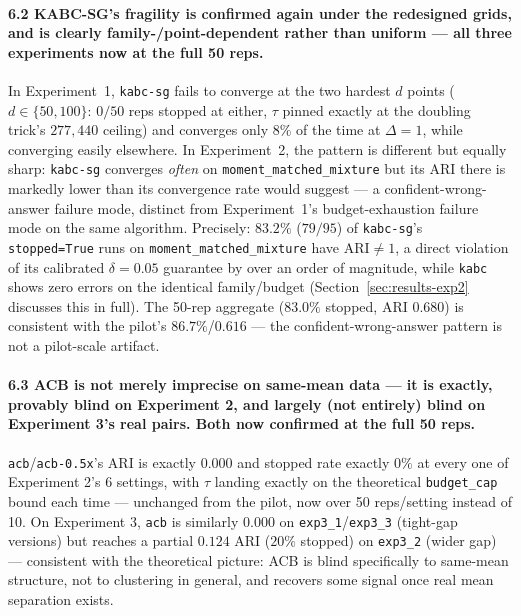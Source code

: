 \documentclass[11pt]{article}
\begin{document}
\paragraph{6.2 KABC-SG's fragility is confirmed again under the redesigned
grids, and is clearly family-/point-dependent rather than uniform --- all
three experiments now at the full 50 reps.} In Experiment~1, \texttt{kabc-sg}
fails to converge at the two hardest $d$ points ($d\in\{50,100\}$: $0/50$
reps stopped at either, $\tau$ pinned exactly at the doubling trick's
$277{,}440$ ceiling) and converges only $8\%$ of the time at $\Delta=1$,
while converging easily elsewhere. In Experiment~2, the pattern is
different but equally sharp: \texttt{kabc-sg} converges \emph{often} on
\texttt{moment\_matched\_mixture} but its ARI there is markedly lower than
its convergence rate would suggest --- a confident-wrong-answer failure
mode, distinct from Experiment~1's budget-exhaustion failure mode on the
same algorithm. Precisely: $83.2\%$ ($79/95$) of \texttt{kabc-sg}'s
\texttt{stopped=True} runs on \texttt{moment\_matched\_mixture} have
$\text{ARI}\neq 1$, a direct violation of its calibrated $\delta=0.05$
guarantee by over an order of magnitude, while \texttt{kabc} shows zero
errors on the identical family/budget (Section~\ref{sec:results-exp2}
discusses this in full). The 50-rep aggregate ($83.0\%$ stopped, ARI
$0.680$) is consistent with the pilot's $86.7\%$/$0.616$ --- the
confident-wrong-answer pattern is not a pilot-scale artifact.

\paragraph{6.3 ACB is not merely imprecise on same-mean data --- it is
exactly, provably blind on Experiment 2, and largely (not entirely) blind
on Experiment 3's real pairs. Both now confirmed at the full 50 reps.}
\texttt{acb}/\texttt{acb-0.5x}'s ARI is exactly $0.000$ and stopped rate
exactly $0\%$ at every one of Experiment 2's 6 settings, with $\tau$
landing exactly on the theoretical \texttt{budget\_cap} bound each time
--- unchanged from the pilot, now over 50 reps/setting instead of 10. On
Experiment 3, \texttt{acb} is similarly $0.000$ on
\texttt{exp3\_1}/\texttt{exp3\_3} (tight-gap versions) but reaches a
partial $0.124$ ARI ($20\%$ stopped) on \texttt{exp3\_2} (wider gap) ---
consistent with the theoretical picture: ACB is blind specifically to
same-mean structure, not to clustering in general, and recovers some
signal once real mean separation exists.
\end{document}
